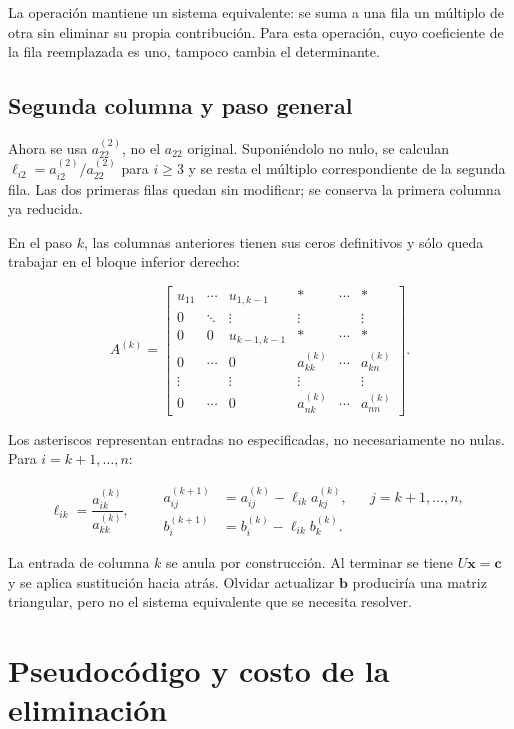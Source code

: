\documentclass[12pt,a4paper]{article}
\begin{document}
La operación mantiene un sistema equivalente: se suma a una fila un múltiplo de otra sin eliminar su propia contribución. Para esta operación, cuyo coeficiente de la fila reemplazada es uno, tampoco cambia el determinante.

\subsection{Segunda columna y paso general}

Ahora se usa $a_{22}^{(2)}$, no el $a_{22}$ original. Suponiéndolo no nulo, se calculan $\ell_{i2}=a_{i2}^{(2)}/a_{22}^{(2)}$ para $i\ge3$ y se resta el múltiplo correspondiente de la segunda fila. Las dos primeras filas quedan sin modificar; se conserva la primera columna ya reducida.

En el paso $k$, las columnas anteriores tienen sus ceros definitivos y sólo queda trabajar en el bloque inferior derecho:

\[
A^{(k)}=
\left[\begin{array}{ccc|ccc}
u_{11}&\cdots&u_{1,k-1}&*&\cdots&*\\
0&\ddots&\vdots&\vdots&&\vdots\\
0&0&u_{k-1,k-1}&*&\cdots&*\\\hline
0&\cdots&0&a_{kk}^{(k)}&\cdots&a_{kn}^{(k)}\\
\vdots&&\vdots&\vdots&&\vdots\\
0&\cdots&0&a_{nk}^{(k)}&\cdots&a_{nn}^{(k)}
\end{array}\right].
\]

Los asteriscos representan entradas no especificadas, no necesariamente no nulas. Para $i=k+1,\ldots,n$:

\[
\ell_{ik}=\frac{a_{ik}^{(k)}}{a_{kk}^{(k)}},\qquad
\begin{aligned}
a_{ij}^{(k+1)}&=a_{ij}^{(k)}-\ell_{ik}a_{kj}^{(k)},&&j=k+1,\ldots,n,\\
b_i^{(k+1)}&=b_i^{(k)}-\ell_{ik}b_k^{(k)}.
\end{aligned}
\]

La entrada de columna $k$ se anula por construcción. Al terminar se tiene $U\mathbf x=\mathbf c$ y se aplica sustitución hacia atrás. Olvidar actualizar $\mathbf b$ produciría una matriz triangular, pero no el sistema equivalente que se necesita resolver.

\section{Pseudocódigo y costo de la eliminación}
\end{document}
